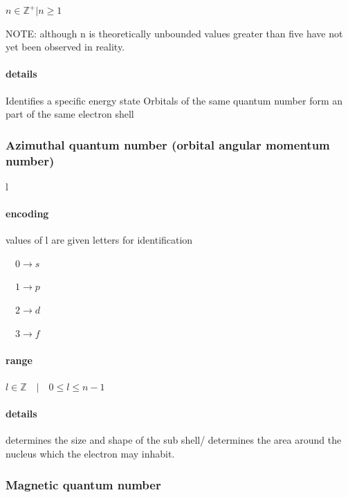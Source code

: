 \documentclass[]{article}
\let\oldparagraph\paragraph
\renewcommand{\paragraph}[1]{\oldparagraph{#1}\mbox{}}
\begin{document}
\(n \in \mathbb{Z}^+| n \geq 1\)

NOTE: although n is theoretically unbounded values greater than five
have not yet been observed in reality.

\hypertarget{details}{%
\paragraph{details}\label{details}}

Identifies a specific energy state Orbitals of the same quantum number
form an part of the same electron shell

\hypertarget{azimuthal-quantum-number-orbital-angular-momentum-number}{%
\subsubsection{Azimuthal quantum number (orbital angular momentum
number)}\label{azimuthal-quantum-number-orbital-angular-momentum-number}}

l

\hypertarget{encoding}{%
\paragraph{encoding}\label{encoding}}

values of l are given letters for identification

\(\quad 0\rightarrow s\)

\(\quad 1\rightarrow p\)

\(\quad 2\rightarrow d\)

\(\quad 3\rightarrow f\)

\hypertarget{range-1}{%
\paragraph{range}\label{range-1}}

\(l\in \mathbb{Z}\quad | \quad 0 \leq l \leq n-1\quad\)

\hypertarget{details-1}{%
\paragraph{details}\label{details-1}}

determines the size and shape of the sub shell/ determines the area
around the nucleus which the electron may inhabit.

\hypertarget{magnetic-quantum-number}{%
\subsubsection{Magnetic quantum number}\label{magnetic-quantum-number}}
\end{document}
